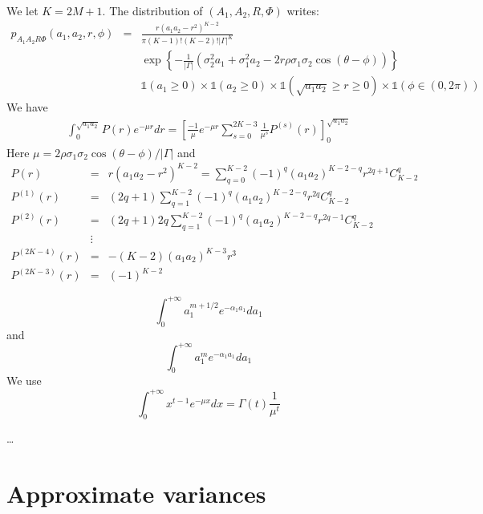 We let $K=2M+1$.
The distribution of $(A_{1},A_{2},R,\Phi)$ writes:
\begin{eqnarray}
\label{eq:wiskart}
 p_{A_{1}A_{2}R\Phi}
 (a_{1},a_{2},r,\phi)
 &=& %
 \frac{r(a_{1}a_{2}-r^{2})^{K-2}}{\pi (K-1)!(K-2)!|\Gamma|^{K}}
 \\
 && \nonumber
 \exp\left\{
 -\frac{1}{|\Gamma|}
 \left(\sigma_{2}^{2}a_{1}+\sigma_{1}^{2}a_{2}
 -2r\rho\sigma_{1}\sigma_{2}\cos(\theta-\phi)
 \right)
 \right\}
 \\
 &&\nonumber
 \mathds{1}(a_{1}\geq 0)
 \times\mathds{1}(a_{2}\geq 0)
 \times\mathds{1}(\sqrt{a_{1}a_{2}}\geq r\geq 0)
 \times\mathds{1}(\phi\in(0,2\pi))
\end{eqnarray}
We have
\begin{eqnarray*}
 \int_{0}^{\sqrt{a_{1}a_{2}}} P(r)e^{-\mu r}dr = 
 \left[\frac{-1}{\mu}e^{-\mu r}\sum_{s=0}^{2K-3}\frac{1}{\mu^{s}}P^{(s)}(r)
 \right]_{0}^{\sqrt{a_{1}a_{2}}}
\end{eqnarray*}
Here $\mu = 2\rho\sigma_{1}\sigma_{2}\cos(\theta-\phi)/|\Gamma|$ and
\begin{eqnarray*}
 P(r)&=&r(a_{1}a_{2}-r^{2})^{K-2}=\sum_{q=0}^{K-2}(-1)^{q}
 (a_{1}a_{2})^{K-2-q}r^{2q+1}C_{K-2}^{q}
 \\
 P^{(1)}(r)&=&(2q+1)\sum_{q=1}^{K-2}(-1)^{q}
 (a_{1}a_{2})^{K-2-q}r^{2q}C_{K-2}^{q}
 \\
 P^{(2)}(r)&=&(2q+1)2q
 \sum_{q=1}^{K-2}(-1)^{q}
(a_{1}a_{2})^{K-2-q}r^{2q-1}C_{K-2}^{q}
 \\
 &\vdots
 \\
 P^{(2K-4)}(r)&=&-(K-2)(a_{1}a_{2})^{K-3}r^{3}
 \\
 P^{(2K-3)}(r)&=&(-1)^{K-2}
\end{eqnarray*}

\newpage
$$
 \int_{0}^{+\infty} a_{1}^{m+1/2}e^{-\alpha_{1}a_{1}}da_{1}
$$
and
$$
 \int_{0}^{+\infty} a_{1}^{m}e^{-\alpha_{1}a_{1}}da_{1}
$$
We use
$$
 \int_{0}^{+\infty} x^{t-1}e^{-\mu x}dx =\Gamma(t)\frac{1}{\mu^{t}}
$$

\dots
\section{Approximate variances}
\label{ss:varianceexpressions}
